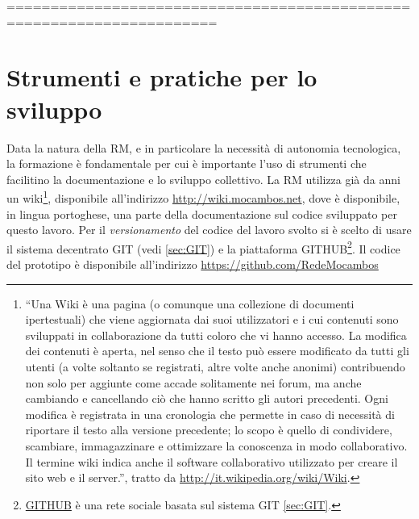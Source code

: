 ======================================================================



\section{Strumenti e pratiche per lo sviluppo}
Data la natura della RM, e in particolare la necessità di autonomia
tecnologica, la formazione è fondamentale per cui è importante l'uso
di strumenti che facilitino la documentazione e lo sviluppo
collettivo. La RM utilizza già da anni un wiki\footnote{``Una Wiki è
  una pagina (o comunque una collezione di documenti ipertestuali) che
  viene aggiornata dai suoi utilizzatori e i cui contenuti sono
  sviluppati in collaborazione da tutti coloro che vi hanno
  accesso. La modifica dei contenuti è aperta, nel senso che il testo
  può essere modificato da tutti gli utenti (a volte soltanto se
  registrati, altre volte anche anonimi) contribuendo non solo per
  aggiunte come accade solitamente nei forum, ma anche cambiando e
  cancellando ciò che hanno scritto gli autori precedenti.  Ogni
  modifica è registrata in una cronologia che permette in caso di
  necessità di riportare il testo alla versione precedente; lo scopo è
  quello di condividere, scambiare, immagazzinare e ottimizzare la
  conoscenza in modo collaborativo. Il termine wiki indica anche il
  software collaborativo utilizzato per creare il sito web e il
  server.'', tratto da \url{http://it.wikipedia.org/wiki/Wiki}.},
disponibile all'indirizzo \url{http://wiki.mocambos.net}, dove è
disponibile, in lingua portoghese, una parte della documentazione sul
codice sviluppato per questo lavoro. Per il \emph{versionamento} del
codice del lavoro svolto si è scelto di usare il sistema decentrato
GIT (vedi \ref{sec:GIT}) e la piattaforma
GITHUB\footnote{\href{http://github.com}{GITHUB} è una rete sociale
  basata sul sistema GIT \ref{sec:GIT}.}. Il codice del prototipo è
disponibile all'indirizzo \url{https://github.com/RedeMocambos}

